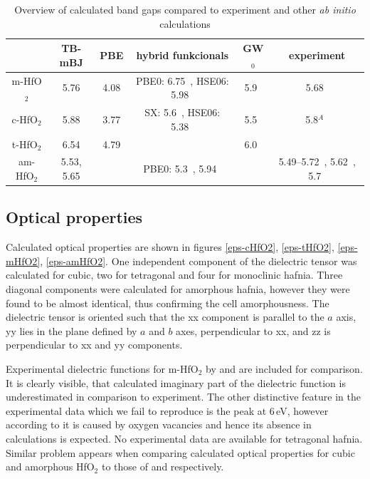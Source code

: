 \documentclass[10pt,a4paper,twocolumn]{article}
\begin{document}
\begin{table}
\begin{center}

\begin{tabular}{c|ccccc}
			& TB-mBJ & PBE & hybrid funkcionals & GW$_0$ & experiment \\
\hline
m-HfO$_2$ &	5.76 & 4.08 & PBE0: 6.75~\cite{Komsa2010}, HSE06: 5.98~\cite{Komsa2010} & 5.9~\cite{Gruning2010} & 5.68~\cite{Balog1977} \\
c-HfO$_2$ &	5.88 & 3.77 & SX: 5.6~\cite{Clark2010}, HSE06: 5.38~\cite{Yang2014} & 5.5~\cite{Gruning2010} & 5.8$^A$~\cite{Lim2002}\\
t-HfO$_2$ &	6.54 & 4.79 &  & 6.0~\cite{Gruning2010} & \\
am-HfO$_2$ & 5.53, 5.65 & & PBE0: 5.3~\cite{Broqvist2007}, 5.94~\cite{Chen2011} &  & 5.49--5.72~\cite{Takeuchi2004}, 5.62~\cite{Nguyen2005}, 5.7~\cite{Perevalov2007}\\

\end{tabular}
\caption{Overview of calculated band gaps compared to experiment and other \textit{ab initio} calculations}
\label{gaps}
\end{center}
\end{table}

\subsection{Optical properties}

Calculated optical properties are shown in figures \ref{eps-cHfO2}, \ref{eps-tHfO2}, \ref{eps-mHfO2}, \ref{eps-amHfO2}.
One independent component of the dielectric tensor was calculated for cubic, two for tetragonal and four for monoclinic hafnia.
Three diagonal components were calculated for amorphous hafnia, however they were found to be almost identical, thus confirming the cell amorphousness.
The dielectric tensor is oriented such that the xx component is parallel to the $a$ axis, yy lies in the plane defined by $a$ and $b$ axes, perpendicular to xx, and zz is perpendicular to xx and yy components.

Experimental dielectric functions for m-HfO$_2$ by \citet{Edwards2003} and \citet{Nguyen2005} are included for comparison.
It is clearly visible, that calculated imaginary part of the dielectric function is underestimated in comparison to experiment.
The other distinctive feature in the experimental data which we fail to reproduce is the peak at 6\,eV, however according to \cite{Takeuchi2004} it is caused by oxygen vacancies and hence its absence in calculations is expected.
No experimental data are available for tetragonal hafnia.
Similar problem appears when comparing calculated optical properties for cubic and amorphous HfO$_2$ to those of \citet{Lim2002} and \citet{Nguyen2005} respectively.
\end{document}
